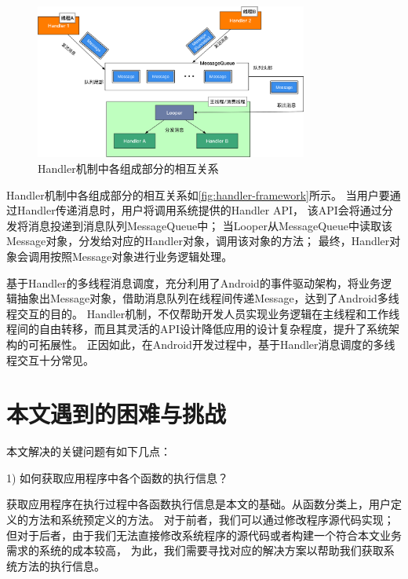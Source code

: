 \begin{figure}[!hb]
	\centering
	\includegraphics[width=0.8\textwidth]{./Figures/Handler-framework.png}
	\caption{ Handler机制中各组成部分的相互关系}
	\label{fig:handler-framework}
\end{figure}

Handler机制中各组成部分的相互关系如\autoref{fig:handler-framework}所示。
当用户要通过Handler传递消息时，用户将调用系统提供的Handler API，
该API会将通过分发将消息投递到消息队列MessageQueue中；
当Looper从MessageQueue中读取该Message对象，分发给对应的Handler对象，调用该对象的方法；%
最终，Handler对象会调用按照Message对象进行业务逻辑处理。

基于Handler的多线程消息调度，充分利用了Android的事件驱动架构，将业务逻辑抽象出Message对象，借助消息队列在线程间传递Message，达到了Android多线程交互的目的。
Handler机制，不仅帮助开发人员实现业务逻辑在主线程和工作线程间的自由转移，而且其灵活的API设计降低应用的设计复杂程度，提升了系统架构的可拓展性。
正因如此，在Android开发过程中，基于Handler消息调度的多线程交互十分常见。


\section{本文遇到的困难与挑战}


本文解决的关键问题有如下几点：

1)	如何获取应用程序中各个函数的执行信息？

获取应用程序在执行过程中各函数执行信息是本文的基础。从函数分类上，用户定义的方法和系统预定义的方法。
对于前者，我们可以通过修改程序源代码实现；但对于后者，由于我们无法直接修改系统程序的源代码或者构建一个符合本文业务需求的系统的成本较高，
为此，我们需要寻找对应的解决方案以帮助我们获取系统方法的执行信息。

